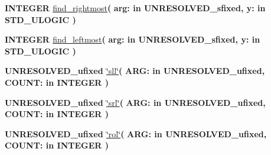 \begin{DoxyCompactItemize}
\item 
{\bfseries {\bfseries \textcolor{comment}{I\+N\+T\+E\+G\+E\+R}\textcolor{vhdlchar}{ }}} \hyperlink{class__fixed__pkg_a5993175faa64790646b397a112b9124a}{find\+\_\+rightmost}{\bfseries  ( }{\bfseries \textcolor{vhdlchar}{arg\+: }\textcolor{stringliteral}{in }\textcolor{vhdlchar}{U\+N\+R\+E\+S\+O\+L\+V\+E\+D\+\_\+sfixed}}{\bfseries  , \textcolor{vhdlchar}{y\+: }\textcolor{stringliteral}{in }{\bfseries \textcolor{comment}{S\+T\+D\+\_\+\+U\+L\+O\+G\+I\+C}\textcolor{vhdlchar}{ }}}{\bfseries  )} 
\item 
{\bfseries {\bfseries \textcolor{comment}{I\+N\+T\+E\+G\+E\+R}\textcolor{vhdlchar}{ }}} \hyperlink{class__fixed__pkg_a0dfcc29be0080b3406b8147cbcff18a6}{find\+\_\+leftmost}{\bfseries  ( }{\bfseries \textcolor{vhdlchar}{arg\+: }\textcolor{stringliteral}{in }\textcolor{vhdlchar}{U\+N\+R\+E\+S\+O\+L\+V\+E\+D\+\_\+sfixed}}{\bfseries  , \textcolor{vhdlchar}{y\+: }\textcolor{stringliteral}{in }{\bfseries \textcolor{comment}{S\+T\+D\+\_\+\+U\+L\+O\+G\+I\+C}\textcolor{vhdlchar}{ }}}{\bfseries  )} 
\item 
{\bfseries {\bfseries \textcolor{vhdlchar}{U\+N\+R\+E\+S\+O\+L\+V\+E\+D\+\_\+ufixed}\textcolor{vhdlchar}{ }}} \hyperlink{class__fixed__pkg_aad968eb6805375f56208595b46969395}{\char`\"{}sll\char`\"{}}{\bfseries  ( }{\bfseries \textcolor{vhdlchar}{A\+R\+G\+: }\textcolor{stringliteral}{in }\textcolor{vhdlchar}{U\+N\+R\+E\+S\+O\+L\+V\+E\+D\+\_\+ufixed}}{\bfseries  , \textcolor{vhdlchar}{C\+O\+U\+N\+T\+: }\textcolor{stringliteral}{in }{\bfseries \textcolor{comment}{I\+N\+T\+E\+G\+E\+R}\textcolor{vhdlchar}{ }}}{\bfseries  )} 
\item 
{\bfseries {\bfseries \textcolor{vhdlchar}{U\+N\+R\+E\+S\+O\+L\+V\+E\+D\+\_\+ufixed}\textcolor{vhdlchar}{ }}} \hyperlink{class__fixed__pkg_aa5150cdcb54496878a67845683c19d7b}{\char`\"{}srl\char`\"{}}{\bfseries  ( }{\bfseries \textcolor{vhdlchar}{A\+R\+G\+: }\textcolor{stringliteral}{in }\textcolor{vhdlchar}{U\+N\+R\+E\+S\+O\+L\+V\+E\+D\+\_\+ufixed}}{\bfseries  , \textcolor{vhdlchar}{C\+O\+U\+N\+T\+: }\textcolor{stringliteral}{in }{\bfseries \textcolor{comment}{I\+N\+T\+E\+G\+E\+R}\textcolor{vhdlchar}{ }}}{\bfseries  )} 
\item 
{\bfseries {\bfseries \textcolor{vhdlchar}{U\+N\+R\+E\+S\+O\+L\+V\+E\+D\+\_\+ufixed}\textcolor{vhdlchar}{ }}} \hyperlink{class__fixed__pkg_a0b1d7e62fa044f078a21134a782f676b}{\char`\"{}rol\char`\"{}}{\bfseries  ( }{\bfseries \textcolor{vhdlchar}{A\+R\+G\+: }\textcolor{stringliteral}{in }\textcolor{vhdlchar}{U\+N\+R\+E\+S\+O\+L\+V\+E\+D\+\_\+ufixed}}{\bfseries  , \textcolor{vhdlchar}{C\+O\+U\+N\+T\+: }\textcolor{stringliteral}{in }{\bfseries \textcolor{comment}{I\+N\+T\+E\+G\+E\+R}\textcolor{vhdlchar}{ }}}{\bfseries  )} 

\end{DoxyCompactItemize}
